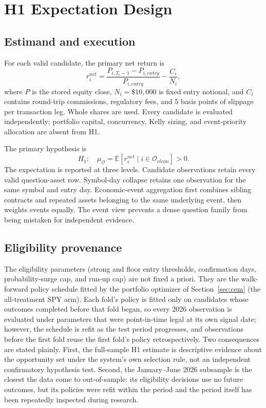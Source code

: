 \documentclass[sigconf,anonymous]{acmart}
\begin{document}
\section{H1 Expectation Design}

\subsection{Estimand and execution}

For each valid candidate, the primary net return is
\[
r^{net}_i = \frac{P_{i,T_e-1}-P_{i,entry}}{P_{i,entry}}
-\frac{C_i}{N_i},
\]
where $P$ is the stored equity close, $N_i=\$10{,}000$ is fixed entry notional, and $C_i$ contains round-trip commissions, regulatory fees, and 5 basis points of slippage per transaction leg. Whole shares are used. Every candidate is evaluated independently; portfolio capital, concurrency, Kelly sizing, and event-priority allocation are absent from H1.

The primary hypothesis is
\[
H_1:\quad
\mu_{\mathcal O}=\mathbb{E}\!\left[r^{net}_i\mid i\in\mathcal O_{clean}\right] > 0.
\]
The expectation is reported at three levels. Candidate observations retain every valid question-asset row. Symbol-day collapse retains one observation for the same symbol and entry day. Economic-event aggregation first combines sibling contracts and repeated assets belonging to the same underlying event, then weights events equally. The event view prevents a dense question family from being mistaken for independent evidence.

\subsection{Eligibility provenance}
\label{sec:provenance}

The eligibility parameters (strong and floor entry thresholds, confirmation days, probability-surge cap, and run-up cap) are not fixed a priori. They are the walk-forward policy schedule fitted by the portfolio optimizer of Section~\ref{sec:cem} (the all-treatment SPY arm). Each fold's policy is fitted only on candidates whose outcomes completed before that fold began, so every 2026 observation is evaluated under parameters that were point-in-time legal at its own signal date; however, the schedule is refit as the test period progresses, and observations before the first fold reuse the first fold's policy retrospectively. Two consequences are stated plainly. First, the full-sample H1 estimate is descriptive evidence about the opportunity set under the system's own selection rule, not an independent confirmatory hypothesis test. Second, the January--June 2026 subsample is the closest the data come to out-of-sample: its eligibility decisions use no future outcomes, but its policies were refit within the period and the period itself has been repeatedly inspected during research.
\end{document}
